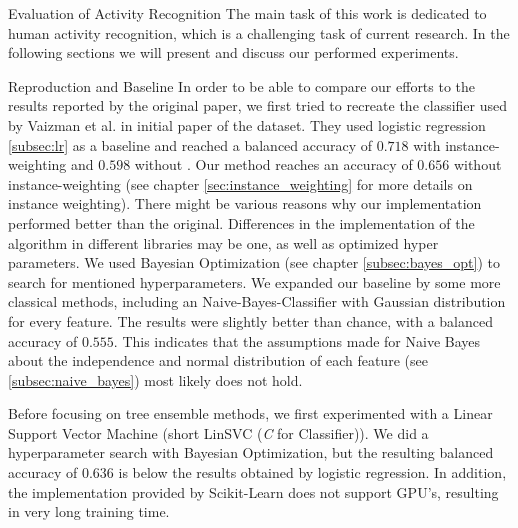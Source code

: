 \begin{section}{Evaluation of Activity Recognition}
	The main task of this work is dedicated to human activity recognition, which is a challenging task of current research. In the following sections we will present and discuss our performed experiments.
	\begin{subsection}{Reproduction and Baseline}
		In order to be able to compare our efforts to the results reported by the original paper, we first tried to recreate the classifier used by Vaizman et al. in initial paper of the dataset. They used logistic regression \ref{subsec:lr} as a baseline and reached a balanced accuracy of $0.718$ with instance-weighting and $0.598$ without \cite{Vaizman18}. Our method reaches an accuracy of $0.656$ without instance-weighting (see chapter \ref{sec:instance_weighting} for more details on instance weighting). There might be various reasons why our implementation performed better than the original. Differences in the implementation of the algorithm in different libraries may be one, as well as optimized hyper parameters. We used Bayesian Optimization (see chapter \ref{subsec:bayes_opt}) to search for mentioned hyperparameters. 
		We expanded our baseline by some more classical methods, including an Naive-Bayes-Classifier with Gaussian distribution for every feature. The results were slightly better than chance, with a balanced accuracy of $0.555$. This indicates that the assumptions made for Naive Bayes about the independence and normal distribution of each feature (see \ref{subsec:naive_bayes}) most likely does not hold. \par
		Before focusing on tree ensemble methods, we first experimented with a Linear Support Vector Machine (short LinSVC (\emph{C} for Classifier)). We did a hyperparameter search with Bayesian Optimization, but the resulting balanced accuracy of $0.636$ is below the results obtained by logistic regression. In addition, the implementation provided by Scikit-Learn does not support GPU's, resulting in very long training time. \par
	\end{subsection}


\end{section}
